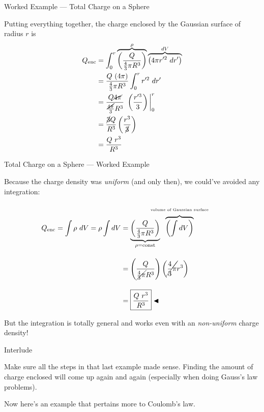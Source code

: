 \documentclass{beamer}
\begin{document}
\begin{frame}{Worked Example --- Total Charge on a Sphere}

Putting everything together, the charge enclosed by the Gaussian surface of radius $r$ is
\begin{align*}
    Q_{\text{enc}} &= \int_{0}^{r} \overbrace{\left( \frac{Q}{\frac{4}{3}\pi R^3} \right)}^{\rho} \overbrace{\left( 4\pi r'^2\ dr' \right)}^{dV} \\
                   &= \frac{Q\ (4\pi)}{\frac{4}{3} \pi R^3} \int_{0}^{r} r'^2\ dr' \\
                   &= \frac{Q \cancel{4\pi}}{\frac{\cancel{4\pi}}{3} R^3}\ \left( \frac{r'^3}{3} \right) \bigg|_{0}^{r} \\
                   &= \frac{\cancel{3} Q}{R^3} \left( \frac{r^3}{\cancel{3}} \right) \\
                   &= \frac{Q\ r^3}{R^3}
\end{align*}

\end{frame}

\begin{frame}{Total Charge on a Sphere --- Worked Example}

Because the charge density was \emph{uniform} (and only then), we could've avoided any integration:
\begin{align*}
    Q_{\text{enc}} = \int \rho\ dV = \rho \int dV &= \underbrace{\left( \frac{Q}{\frac{4}{3} \pi R^3} \right)}_{\rho = \text{const}} \hspace{-0.1\textwidth} \overbrace{\left( \int dV \right)}^{\parbox[c]{0.35\textwidth}{\begin{center} \tiny volume of Gaussian surface \end{center}\vspace{-0.5em}}} \\[1em]
    &= \left( \frac{Q}{\cancel{\frac{4}{3}\pi} R^3} \right)\left( \cancel{\frac{4}{3}\pi} r^3 \right) \\[1em]
    &= \boxed{\frac{Q\ r^3}{R^3}} \blacktriangleleft
\end{align*}

But the integration is totally general and works even with an \emph{non-uniform} charge density!

\end{frame}

\begin{frame}{Interlude}

Make sure all the steps in that last example made sense. Finding the amount of charge enclosed will come up again and again (especially when doing Gauss's law problems).

\vfill

Now here's an example that pertains more to Coulomb's law.

\end{frame}
\end{document}
